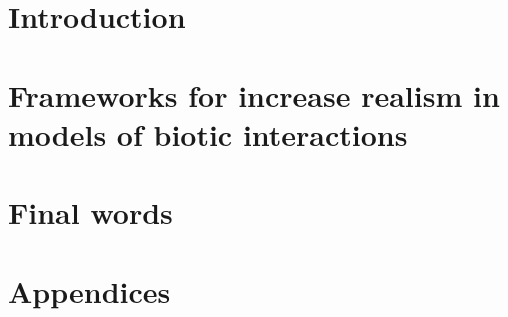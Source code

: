 \cleardoublepage %

\part{Introduction}
\part{Frameworks for increase realism in models of biotic interactions}

\part{Final words}

\cleardoublepage %



\part{Appendices} %











\cleardoublepage %



